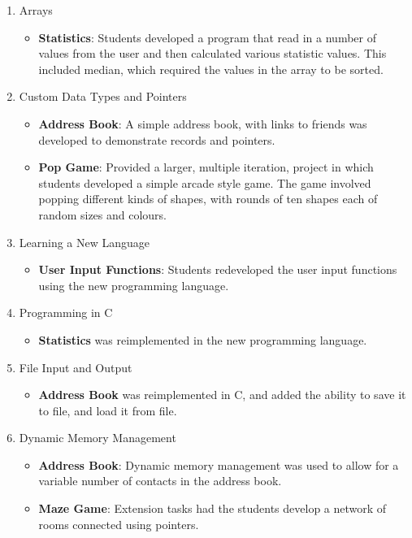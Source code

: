 \begin{enumerate}
\begin{itemize}
  \end{itemize}
  \item Arrays
  \begin{itemize}[noitemsep,nolistsep]
  	\item \textbf{Statistics}: Students developed a program that read in a number of values from the user and then calculated various statistic values. This included median, which required the values in the array to be sorted.
  \end{itemize}
  \item Custom Data Types and Pointers
  \begin{itemize}[noitemsep,nolistsep]
  	\item \textbf{Address Book}: A simple address book, with links to friends was developed to demonstrate records and pointers.
  	\item \textbf{Pop Game}: Provided a larger, multiple iteration, project in which students developed a simple arcade style game. The game involved popping different kinds of shapes, with rounds of ten shapes each of random sizes and colours.
  \end{itemize}
  \item Learning a New Language
  \begin{itemize}[noitemsep,nolistsep]
  	\item \textbf{User Input Functions}: Students redeveloped the user input functions using the new programming language. 
  \end{itemize}
  \item Programming in C
  \begin{itemize}[noitemsep,nolistsep]
  	\item \textbf{Statistics} was reimplemented in the new programming language.
  \end{itemize}
  \item File Input and Output
  \begin{itemize}[noitemsep,nolistsep]
  	\item \textbf{Address Book} was reimplemented in C, and added the ability to save it to file, and load it from file. 
  \end{itemize}

  \item Dynamic Memory Management
  \begin{itemize}[noitemsep,nolistsep]
  	\item \textbf{Address Book}: Dynamic memory management was used to allow for a variable number of contacts in the address book.
  	\item \textbf{Maze Game}: Extension tasks had the students develop a network of rooms connected using pointers.
  \end{itemize}


\end{enumerate}
